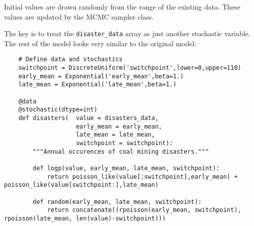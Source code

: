 Initial values are drawn randomly from the range of the existing data. These values are updated by the MCMC sampler class. 

The key is to treat the \texttt{disaster_data} array as just another stochastic variable. The rest of the model looks very similar to the original model:

\begin{verbatim}
	# Define data and stochastics
	switchpoint = DiscreteUniform('switchpoint',lower=0,upper=110)
	early_mean = Exponential('early_mean',beta=1.)
	late_mean = Exponential('late_mean',beta=1.)

	@data
	@stochastic(dtype=int)
	def disasters(  value = disasters_data, 
	                early_mean = early_mean, 
	                late_mean = late_mean, 
	                switchpoint = switchpoint):
	    """Annual occurences of coal mining disasters."""

	    def logp(value, early_mean, late_mean, switchpoint):
	        return poisson_like(value[:switchpoint],early_mean) + poisson_like(value[switchpoint:],late_mean)

	    def random(early_mean, late_mean, switchpoint):
	        return concatenate((rpoisson(early_mean, switchpoint), rpoisson(late_mean, len(value)-switchpoint)))	
\end{verbatim}

